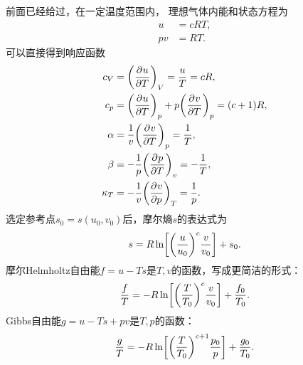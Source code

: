 前面已经给过，在一定温度范围内，
理想气体内能和状态方程为
\begin{subequations}
	\begin{align}
		u &= cRT,\\
		pv &= RT.
	\end{align}
\end{subequations}
可以直接得到响应函数
\begin{subequations}
	\begin{align}
		c_V &= \biggl(\frac{\partial^{}u}{\partial{T}^{}}\biggr)_{V} = \frac uT = cR,\\
		c_p &= \biggl(\frac{\partial^{}u}{\partial{T}^{}}\biggr)_{p} + p\biggl(\frac{\partial^{}v}{\partial{T}^{}}\biggr)_{p} = (c + 1)R,\\
		\alpha &= \frac1v\biggl(\frac{\partial^{}v}{\partial{T}^{}}\biggr)_{p} = \frac1T,\\
		\beta &= -\frac1p\biggl(\frac{\partial^{}p}{\partial{T}^{}}\biggr)_{v} = -\frac1T,\\
		\kappa_T &= -\frac1v\biggl(\frac{\partial^{}v}{\partial{p}^{}}\biggr)_{T} = \frac1p.
	\end{align}
\end{subequations}
选定参考点$s_0 = s(u_0,v_0)$后，摩尔熵$s$的表达式为
\begin{equation}
	s = R\ln\biggl[\biggl(\frac u{u_0}\biggr)^c\frac v{v_0}\biggr] + s_0.
\end{equation}
摩尔Helmholtz自由能$f = u - Ts$是$T,v$的函数，写成更简洁的形式：
\begin{equation}
	\frac fT = -R\ln\biggl[\biggl(\frac T{T_0}\biggr)^c\frac v{v_0}\biggr] + \frac{f_0}{T_0}.
\end{equation}
Gibbs自由能$g = u - Ts + pv$是$T,p$的函数：
\begin{equation}
	\frac gT = -R\ln\biggl[\biggl(\frac T{T_0}\biggr)^{c+1}\frac{p_0}p\biggr] + \frac{g_0}{T_0}.
\end{equation}


